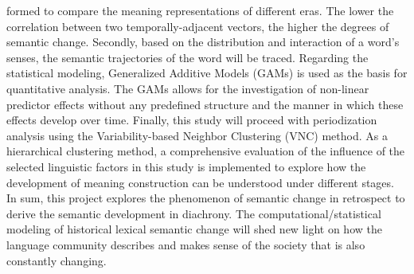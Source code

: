 formed to compare the meaning representations of different eras. The lower the correlation between two temporally-adjacent vectors, the higher the degrees of semantic change. Secondly, based on the distribution and interaction of a word's senses, the semantic trajectories of the word will be traced. Regarding the statistical modeling, Generalized Additive Models (GAMs) is used as the basis for quantitative analysis. The GAMs allows for the investigation of non-linear predictor effects without any predefined structure and the manner in which these effects develop over time. Finally, this study will proceed with periodization analysis using the Variability-based Neighbor Clustering (VNC) method. As a hierarchical clustering method, a comprehensive evaluation of the influence of the selected linguistic factors in this study is implemented to explore how the development of meaning construction can be understood under different stages. In sum, this project explores the phenomenon of semantic change in retrospect to derive the semantic development in diachrony. The computational/statistical modeling of historical lexical semantic change will shed new light on how the language community describes and makes sense of the society that is also constantly changing.


